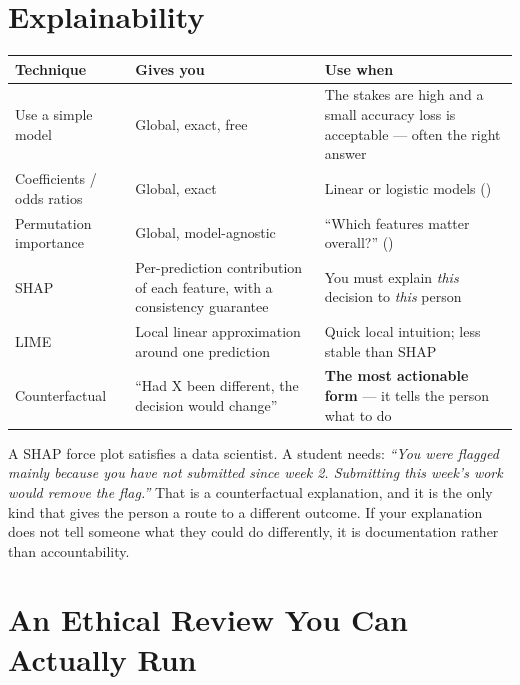 \section{Explainability}

\begin{longtable}{@{}L{3.0cm}L{4.6cm}L{6.6cm}@{}}
\toprule
{}
\textbf{Technique} & \textbf{Gives you} & \textbf{Use when} \\
\midrule
\endhead
Use a simple model & Global, exact, free & The stakes are high and a small accuracy loss is acceptable --- often the right answer \\
Coefficients / odds ratios & Global, exact & Linear or logistic models () \\
Permutation importance & Global, model-agnostic & ``Which features matter overall?'' () \\
SHAP & Per-prediction contribution of each feature, with a consistency guarantee & You must explain \emph{this} decision to \emph{this} person \\
LIME & Local linear approximation around one prediction & Quick local intuition; less stable than SHAP \\
Counterfactual & ``Had X been different, the decision would change'' & \textbf{The most actionable form} --- it tells the person what to do \\
\bottomrule
\end{longtable}

\begin{conceptbox}
A SHAP force plot satisfies a data scientist. A student needs: \emph{``You were
flagged mainly because you have not submitted since week 2. Submitting this week's
work would remove the flag.''} That is a counterfactual explanation, and it is the
only kind that gives the person a route to a different outcome. If your explanation
does not tell someone what they could do differently, it is documentation rather
than accountability.
\end{conceptbox}

\section{An Ethical Review You Can Actually Run}

